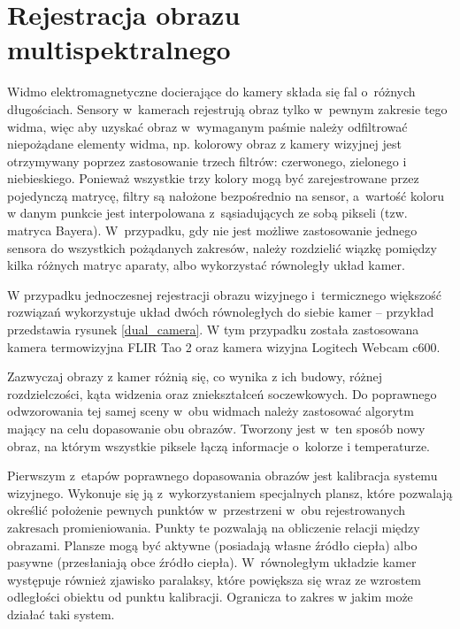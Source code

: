 \section{Rejestracja obrazu multispektralnego}

Widmo elektromagnetyczne docierające do kamery składa się fal o~różnych długościach. 
Sensory w~kamerach rejestrują obraz tylko w~pewnym zakresie tego widma, więc aby uzyskać obraz w~wymaganym paśmie należy odfiltrować niepożądane elementy widma, np. kolorowy obraz z kamery wizyjnej jest otrzymywany poprzez zastosowanie trzech filtrów: czerwonego, zielonego i niebieskiego. 
Ponieważ wszystkie trzy kolory mogą być zarejestrowane przez pojedynczą matrycę, filtry są nałożone bezpośrednio na sensor, a~wartość koloru w danym punkcie jest interpolowana z~sąsiadujących ze sobą pikseli (tzw. matryca Bayera). 
W~przypadku, gdy nie jest możliwe zastosowanie jednego sensora do wszystkich pożądanych zakresów, należy rozdzielić wiązkę pomiędzy kilka różnych matryc aparaty, albo wykorzystać równoległy układ kamer. %

W przypadku jednoczesnej rejestracji obrazu wizyjnego i~termicznego większość rozwiązań wykorzystuje układ dwóch równoległych do siebie kamer -- przykład przedstawia rysunek \ref{dual_camera}. 
W tym przypadku została zastosowana kamera termowizyjna FLIR Tao 2 oraz kamera wizyjna Logitech Webcam c600. 

Zazwyczaj obrazy z kamer różnią się, co wynika z ich budowy, różnej rozdzielczości, kąta widzenia oraz zniekształceń soczewkowych.
Do poprawnego odwzorowania tej samej sceny w~obu widmach należy zastosować algorytm mający na celu dopasowanie obu obrazów.
Tworzony jest w~ten sposób nowy obraz, na którym wszystkie piksele łączą informacje o~kolorze i temperaturze.

Pierwszym z~etapów poprawnego dopasowania obrazów jest kalibracja systemu wizyjnego.
Wykonuje się ją z~wykorzystaniem specjalnych plansz, które pozwalają określić położenie pewnych punktów w~przestrzeni w~obu rejestrowanych zakresach promieniowania.
Punkty te pozwalają na obliczenie relacji między obrazami.
Plansze mogą być aktywne (posiadają własne źródło ciepła) albo pasywne (przesłaniają obce źródło ciepła).
W~równoległym układzie kamer występuje również zjawisko paralaksy, które powiększa się wraz ze wzrostem odległości obiektu od punktu kalibracji. Ogranicza to zakres w jakim może działać taki system. %

